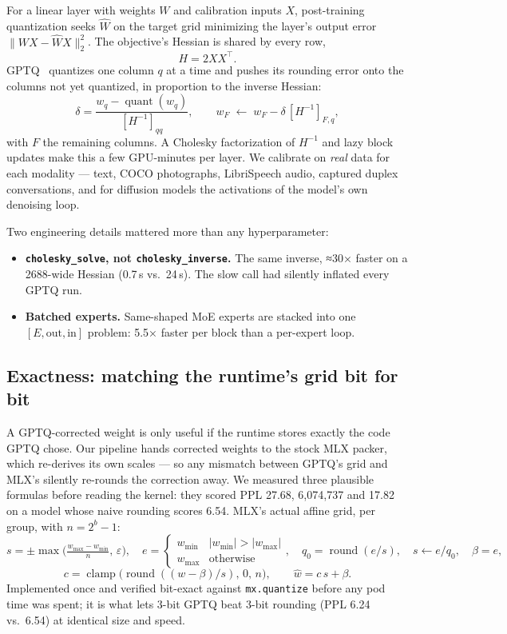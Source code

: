 \documentclass[10pt,letterpaper]{article}
\begin{document}
For a linear layer with weights $W$ and calibration inputs $X$, post-training quantization seeks $\widehat W$ on the target grid minimizing the layer's output error $\lVert WX-\widehat W X\rVert_2^2$. The objective's Hessian is shared by every row,
\[
H = 2XX^{\top}.
\]
GPTQ~\cite{gptq} quantizes one column $q$ at a time and pushes its rounding error onto the columns not yet quantized, in proportion to the inverse Hessian:
\[
\delta = \frac{w_q-\operatorname{quant}(w_q)}{[H^{-1}]_{qq}},\qquad
w_{F}\;\leftarrow\; w_{F}-\delta\,[H^{-1}]_{F,q},
\]
with $F$ the remaining columns. A Cholesky factorization of $H^{-1}$ and lazy block updates make this a few GPU-minutes per layer. We calibrate on \emph{real} data for each modality --- text, COCO photographs, LibriSpeech audio, captured duplex conversations, and for diffusion models the activations of the model's own denoising loop.

Two engineering details mattered more than any hyperparameter:
\begin{itemize}
  \item \textbf{\texttt{cholesky\_solve}, not \texttt{cholesky\_inverse}.} The same inverse, ≈30× faster on a 2688-wide Hessian (0.7\,s vs.\ 24\,s). The slow call had silently inflated every GPTQ run.
  \item \textbf{Batched experts.} Same-shaped MoE experts are stacked into one $[E,\text{out},\text{in}]$ problem: 5.5× faster per block than a per-expert loop.
\end{itemize}

\subsection{Exactness: matching the runtime's grid bit for bit}

A GPTQ-corrected weight is only useful if the runtime stores exactly the code GPTQ chose. Our pipeline hands corrected weights to the stock MLX packer, which re-derives its own scales --- so any mismatch between GPTQ's grid and MLX's silently re-rounds the correction away. We measured three plausible formulas before reading the kernel: they scored PPL 27.68, 6{,}074{,}737 and 17.82 on a model whose naive rounding scores 6.54. MLX's actual affine grid, per group, with $n=2^{b}-1$:
\[
s=\pm\max\!\Big(\tfrac{w_{\max}-w_{\min}}{n},\,\varepsilon\Big),\quad
e=\begin{cases}w_{\min} & |w_{\min}|>|w_{\max}|\\ w_{\max} & \text{otherwise}\end{cases},\quad
q_0=\operatorname{round}(e/s),\quad s\leftarrow e/q_0,\quad \beta=e,
\]
\[
c=\operatorname{clamp}\big(\operatorname{round}((w-\beta)/s),\,0,\,n\big),\qquad \hat w=c\,s+\beta .
\]
Implemented once and verified bit-exact against \texttt{mx.quantize} before any pod time was spent; it is what lets 3-bit GPTQ beat 3-bit rounding (PPL 6.24 vs.\ 6.54) at identical size and speed.
\end{document}
